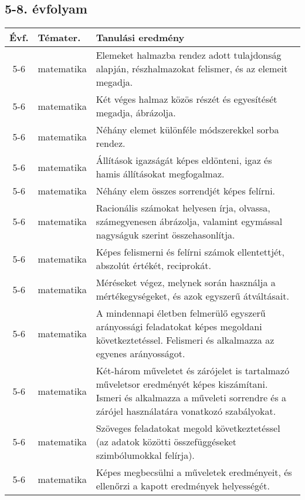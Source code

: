\subsection{5-8. évfolyam}
\begin{small}
  \begin{longtable}{c | p{2cm} |  p{11cm} }
    \textbf{Évf.} & \textbf{Témater.} & \textbf{Tanulási eredmény} \\ \hline \hline
    \endhead

              5-6 & matematika & Elemeket halmazba rendez adott tulajdonság alapján, részhalmazokat felismer, és az elemeit megadja. \\ \hline
              5-6 & matematika & Két véges halmaz közös részét és egyesítését megadja, ábrázolja. \\ \hline
              5-6 & matematika & Néhány elemet különféle módszerekkel sorba rendez. \\ \hline
              5-6 & matematika & Állítások igazságát képes eldönteni, igaz és hamis állításokat megfogalmaz. \\ \hline
              5-6 & matematika & Néhány elem összes sorrendjét képes felírni. \\ \hline
              5-6 & matematika & Racionális számokat helyesen írja, olvassa, számegyenesen ábrázolja, valamint  egymással nagyságuk szerint összehasonlítja. \\ \hline
              5-6 & matematika & Képes felismerni és felírni számok ellentettjét, abszolút értékét, reciprokát. \\ \hline
              5-6 & matematika & Méréseket végez, melynek során használja a mértékegységeket, és azok egyszerű átváltásait. \\ \hline
              5-6 & matematika & A mindennapi életben felmerülő egyszerű arányossági feladatokat képes megoldani következtetéssel. Felismeri és alkalmazza az egyenes arányosságot. \\ \hline
              5-6 & matematika & Két-három műveletet és zárójelet is tartalmazó műveletsor eredményét képes kiszámítani. Ismeri és alkalmazza a műveleti sorrendre és a zárójel használatára vonatkozó szabályokat. \\ \hline
              5-6 & matematika & Szöveges feladatokat megold következtetéssel (az adatok közötti összefüggéseket szimbólumokkal felírja). \\ \hline
              5-6 & matematika & Képes megbecsülni a műveletek eredményeit, és ellenőrzi a kapott eredmények helyességét. \\ \hline

\end{longtable}
\end{small}
